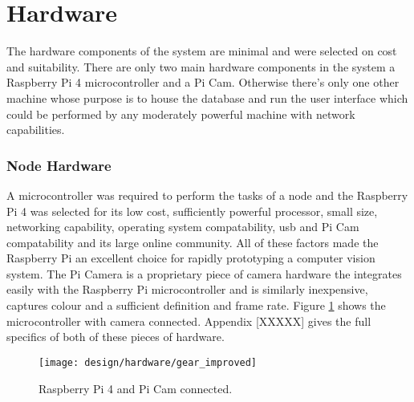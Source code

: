 \section{Hardware}

The hardware components of the system are minimal and were selected on cost and suitability. There are only two main hardware components in the system a Raspberry Pi 4 microcontroller and a Pi Cam. Otherwise there's only one other machine whose purpose is to house the database and run the user interface which could be performed by any moderately powerful machine with network capabilities.

\subsubsection{Node Hardware}

A microcontroller was required to perform the tasks of a node and the Raspberry Pi 4 was selected for its low cost, sufficiently powerful processor, small size, networking capability, operating system compatability, usb and Pi Cam compatability and its large online community. All of these factors made the Raspberry Pi an excellent choice for rapidly prototyping a computer vision system. The Pi Camera is a proprietary piece of camera hardware the integrates easily with the Raspberry Pi microcontroller and is similarly inexpensive, captures colour and a sufficient definition and frame rate. Figure \ref{fig:raspi_gear} shows the microcontroller with camera connected. Appendix [XXXXX] gives the full specifics of both of these pieces of hardware.

\begin{figure}[H]
    \centering
    \centering\texttt{[image: design/hardware/gear\_improved]}
    \caption{Raspberry Pi 4 and Pi Cam connected.}
    \label{fig:raspi_gear}
  \end{figure}
  